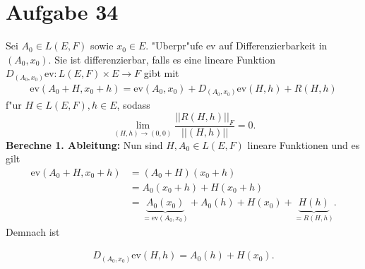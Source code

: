 \documentclass[a4paper, landscape,twocolumn,fontsize=8pt]{scrartcl}
\theoremstyle{plain}
\begin{document}
\section*{Aufgabe 34}
Sei $A_0 \in L(E,F)$ sowie $x_0 \in E$. "Uberpr"ufe $\mathrm{ev}$ auf Differenzierbarkeit in $(A_0,x_0)$. Sie ist differenzierbar, falls es eine lineare Funktion $D_{(A_0,x_0)}\mathrm{ev}: L(E,F) \times E \to F$ gibt mit 
\begin{align*}
    \mathrm{ev}(A_0+H,x_0+h) = \mathrm{ev}(A_0,x_0) + D_{(A_0,x_0)}\mathrm{ev}(H,h) + R(H,h)
\end{align*}
f"ur $H \in L(E,F), h \in E$, sodass 
\[
    \lim_{(H,h) \to (0,0)} \frac{||R(H,h)||_F}{||(H,h)||} = 0.
\]
\textbf{Berechne 1. Ableitung:} Nun sind $H,A_0 \in L(E,F)$ lineare Funktionen und es gilt 
\begin{align*}
    \mathrm{ev}(A_0+H,x_0+h) &= (A_0+H)(x_0+h)\\ 
    &= A_0(x_0+h) + H(x_0+h)\\ 
    &= \underbrace{A_0(x_0)}_{=\mathrm{ev}(A_0,x_0)}+A_0(h) + H(x_0) + \underbrace{H(h)}_{=R(H,h)}.
\end{align*}
Demnach ist 
\begin{framed}
\begin{align}\label{glumanda}
    D_{(A_0,x_0)}\mathrm{ev}(H,h) = A_0(h) + H(x_0).
\end{align}
\end{framed}
\end{document}
